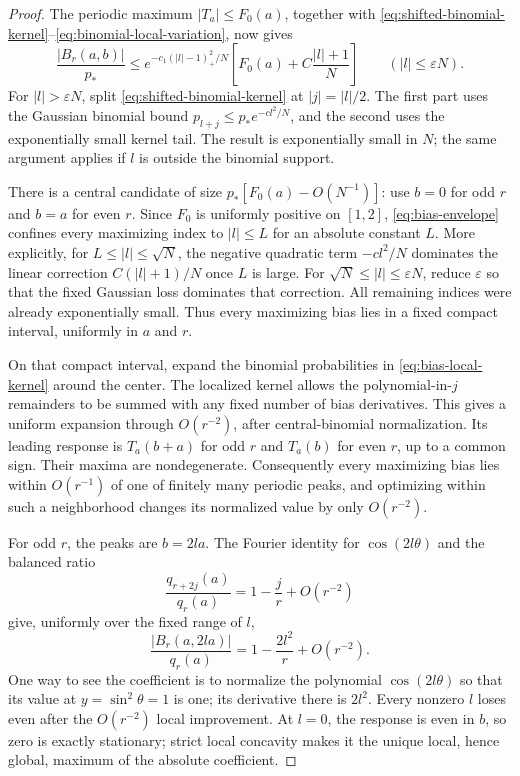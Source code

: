 \begin{proof}
The periodic maximum $|T_a|\le F_0(a)$, together with
\eqref{eq:shifted-binomial-kernel}--\eqref{eq:binomial-local-variation},
now gives
\begin{equation}\label{eq:bias-envelope}
 \frac{|B_r(a,b)|}{p_*}
 \le e^{-c_1(|l|-1)_+^2/N}
       \left[F_0(a)+C\frac{|l|+1}{N}\right]
 \qquad(|l|\le\varepsilon N).
\end{equation}
For $|l|>\varepsilon N$, split
\eqref{eq:shifted-binomial-kernel} at $|j|=|l|/2$.
The first part uses the Gaussian binomial bound
$p_{l+j}\le p_*e^{-cl^2/N}$, and the second uses the exponentially
small kernel tail. The result is exponentially small in $N$;
the same argument applies if $l$ is outside the binomial support.

There is a central candidate of size
$p_*[F_0(a)-O(N^{-1})]$: use $b=0$ for odd $r$ and $b=a$ for even
$r$. Since $F_0$ is uniformly positive on $[1,2]$,
\eqref{eq:bias-envelope} confines every maximizing index to
$|l|\le L$ for an absolute constant $L$. More explicitly, for
$L\le|l|\le\sqrt N$, the negative quadratic term $-cl^2/N$
dominates the linear correction $C(|l|+1)/N$ once $L$ is large.
For $\sqrt N\le|l|\le\varepsilon N$, reduce $\varepsilon$ so
that the fixed Gaussian loss dominates that correction. All remaining
indices were already exponentially small. Thus every maximizing bias
lies in a fixed compact interval, uniformly in $a$ and $r$.

On that compact interval, expand the binomial probabilities in
\eqref{eq:bias-local-kernel} around the center. The localized kernel
allows the polynomial-in-$j$ remainders to be summed with any fixed
number of bias derivatives. This gives a uniform expansion through
$O(r^{-2})$, after central-binomial normalization. Its leading response
is $T_a(b+a)$ for odd $r$ and $T_a(b)$ for even $r$, up to a common
sign. Their maxima are nondegenerate. Consequently every maximizing
bias lies within $O(r^{-1})$ of one of finitely many periodic peaks,
and optimizing within such a neighborhood changes its normalized
value by only $O(r^{-2})$.

For odd $r$, the peaks are $b=2la$. The Fourier identity for
$\cos(2l\theta)$ and the balanced ratio
\[
 \frac{q_{r+2j}(a)}{q_r(a)}=1-\frac jr+O(r^{-2})
\]
give, uniformly over the fixed range of $l$,
\begin{equation}\label{eq:odd-bias-peak-loss}
 \frac{|B_r(a,2la)|}{q_r(a)}
       =1-\frac{2l^2}{r}+O(r^{-2}).
\end{equation}
One way to see the coefficient is to normalize the polynomial
$\cos(2l\theta)$ so that its value at
$y=\sin^2\theta=1$ is one; its derivative there is $2l^2$.
Every nonzero $l$ loses even after the $O(r^{-2})$ local improvement.
At $l=0$, the response is even in $b$, so zero is exactly stationary;
strict local concavity makes it the unique local, hence global,
maximum of the absolute coefficient.


\end{proof}
